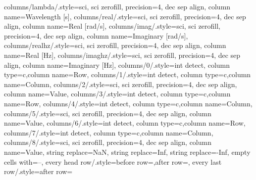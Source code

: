 {columns/lambda/.style={sci, sci zerofill, precision=4,  dec sep align, column name={Wavelength [s]}},
columns/real/.style={sci, sci zerofill, precision=4,  dec sep align, column name={Real [rad/s]}},
columns/imag/.style={sci, sci zerofill, precision=4,  dec sep align, column name={Imaginary [rad/s]}},
columns/realhz/.style={sci, sci zerofill, precision=4,  dec sep align, column name={Real [Hz]}},
columns/imaghz/.style={sci, sci zerofill, precision=4,  dec sep align, column name={Imaginary [Hz]}},
columns/0/.style={int detect, column type=c,column name={Row}},
columns/1/.style={int detect, column type=c,column name={Column}},
columns/2/.style={sci, sci zerofill, precision=4,  dec sep align, column name={Value}},
columns/3/.style={int detect, column type=c,column name={Row}},
columns/4/.style={int detect, column type=c,column name={Column}},
columns/5/.style={sci, sci zerofill, precision=4,  dec sep align, column name={Value}},
columns/6/.style={int detect, column type=c,column name={Row}},
columns/7/.style={int detect, column type=c,column name={Column}},
columns/8/.style={sci, sci zerofill, precision=4,  dec sep align, column name={Value}},
string replace={NaN}{},
string replace={Inf}{},
string replace={-Inf}{},
empty cells with={--},
every head row/.style={before row=\toprule,after row=\midrule},
every last row/.style={after row=\bottomrule}}
